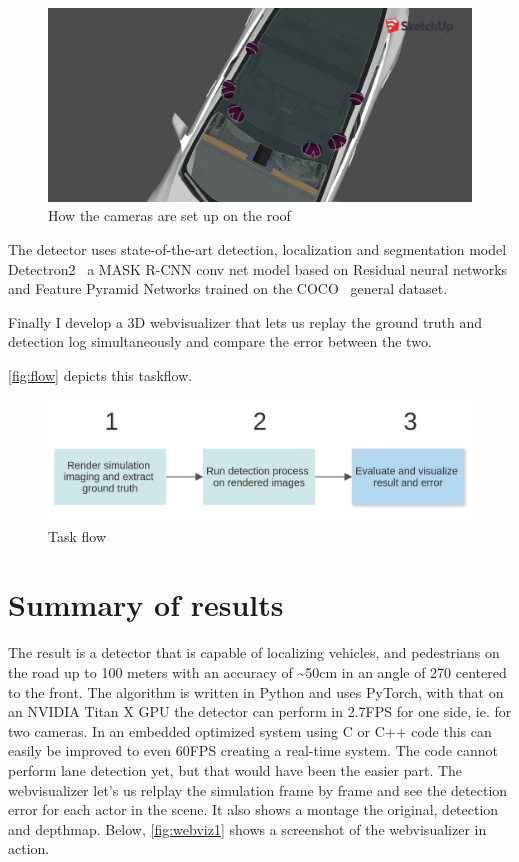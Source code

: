 \begin{figure}[!ht]
    \centering
    \includegraphics[width=150mm, keepaspectratio]{figures/3dmodel2.png}
    \caption{How the cameras are set up on the roof}
    \label{fig:3dmodel2}
\end{figure}

The detector uses state-of-the-art detection, localization and segmentation model
Detectron2~\cite{wu2019detectron2} a MASK R-CNN conv net model based on Residual
neural networks and Feature Pyramid Networks trained on the COCO~\cite{DBLP:journals/corr/LinMBHPRDZ14} general
dataset.

Finally I develop a 3D webvisualizer that lets us replay the ground truth and
detection log simultaneously and compare the error between the two.

\autoref{fig:flow} depicts this taskflow.

\begin{figure}[!ht]
    \centering
    \includegraphics[width=150mm, keepaspectratio]{figures/flowchart.png}
    \caption{Task flow}
    \label{fig:flow}
\end{figure}

\section{Summary of results}

The result is a detector that is capable of localizing vehicles, and pedestrians
on the road up to 100 meters with an accuracy of \textasciitilde50cm in an angle of 270\degree
centered to the front. The algorithm is written in Python and uses PyTorch, with that on
an NVIDIA Titan X GPU the detector can perform in 2.7FPS for one side, ie. for
two cameras. In an embedded optimized system using C or C++ code this can easily
be improved to even 60FPS creating a real-time system. The code cannot perform
lane detection yet, but that would have been the easier part. The webvisualizer
let's us relplay the simulation frame by frame and see the detection error for
each actor in the scene. It also shows a montage the original, detection and
depthmap. Below, \autoref{fig:webviz1} shows a screenshot of the webvisualizer
in action.

